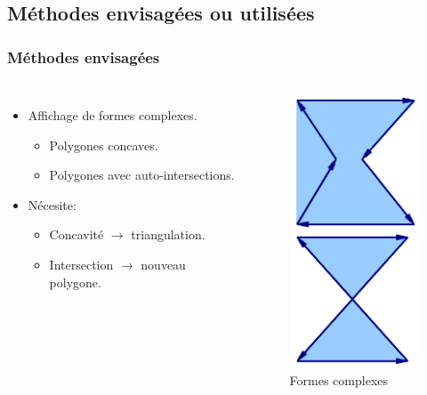 \documentclass{beamer}
\begin{document}
\subsection{Méthodes envisagées ou utilisées}
\begin{frame}
    \frametitle{Méthodes envisagées}
    \begin{columns}
        \begin{itemize}
            \item Affichage de formes complexes.
                \begin{itemize}
                    \item Polygones concaves.
                    \item Polygones avec auto-intersections.
                \end{itemize}
            \item Nécesite:
                \begin{itemize}
                    \item Concavité $\rightarrow$ triangulation.
                    \item Intersection $\rightarrow$ nouveau polygone.
                \end{itemize}
        \end{itemize}
        \begin{figure}
            \includegraphics[width=.5\textwidth]{img/concave.png}
            \caption{Formes complexes}
        \end{figure}
    \end{columns}
\end{frame}
\end{document}
